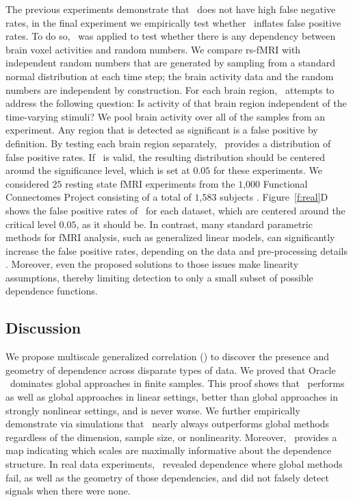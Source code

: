 \documentclass[11pt]{article}
\begin{document}
The previous experiments demonstrate that \Mgc~does not have high false negative rates, in the final experiment we empirically test whether \Mgc~inflates false positive rates. To do so, \Mgc~was applied to test whether there is any dependency between brain voxel activities and random numbers.
We compare rs-fMRI with independent random numbers that are generated by sampling from a standard normal distribution at each time step; the brain activity data and the random numbers are independent by construction.
For each brain region, \Mgc~attempts to address the following question: Is activity of that  brain region independent of the time-varying stimuli? We pool brain activity over all of the samples from an experiment.
Any region that is detected as significant is a false positive by definition.  By testing each brain region separately, \Mgc~provides a distribution of false positive rates.  If \Mgc~is valid, the resulting distribution should be centered around the significance level, which is set at $0.05$ for these experiments.
% 
We considered $25$ resting state fMRI experiments from the $1$,$000$ Functional Connectomes Project  consisting of a total of $1$,$583$ subjects \cite{biswal2010toward}.
Figure~\ref{f:real}{\color{magenta}D} shows the false positive rates of  \Mgc~for each dataset, which are centered around the critical level $0.05$, as it should be.
In contrast, many standard parametric methods for fMRI analysis, such as generalized linear models, can significantly increase the false positive rates, depending on the data and pre-processing details \cite{EklundKnutsson2012,Eklund2015}. Moreover, even the proposed solutions to those issues make linearity assumptions, thereby limiting detection to only a small subset of possible dependence functions.

\subsection*{Discussion}
\label{conclu}

We propose multiscale generalized correlation (\Mgc) to discover the presence and geometry of dependence across disparate types of data.
We proved that Oracle \Mgc~dominates global approaches in finite samples.  This proof shows that \Mgc~performs as well as global approaches in linear settings, better than global approaches in strongly nonlinear settings, and is never worse. We further empirically demonstrate via simulations that \Mgc~nearly always outperforms global methods regardless of the dimension, sample size, or nonlinearity.  Moreover, \Mgc~provides a map indicating which scales are maximally informative about the dependence structure. 
In real data experiments, \Mgc~revealed dependence where global methods fail, as well as the geometry of those dependencies, and did not falsely detect signals when there were none. 
\end{document}
